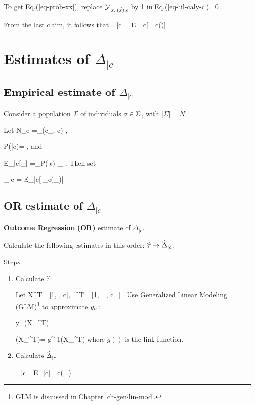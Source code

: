 To get  Eq.(\ref{eq-prob-xx}), 
replace ${\cal Y}_{|x_c({{\widetilde{x}}}), c}$ by 1
in Eq.(\ref{eq-til-caly-c}).
\qed

From the last claim, it follows that
\beq
\Delta_{|c} = 
{E_{\ul{\tilx}|c}[
\lam_c(\tilx)]}
\eeq


\section{Estimates of $\Delta_{|c}$}

\subsection{Empirical estimate of $\Delta_{|c}$ }
Consider a population $\Sigma$
of individuals $\sigma\in \Sigma$,
with $|\Sigma|=N$.

Let
\beq
N_c =\sum_\s \delta(c_\s, c)
\;,
\eeq

\beq
P(\s|c)= 
\;,
\eeq
and

\beq
E_{\s|c}[\xi_\s] =\sum_\s P(\s|c) \xi_\s
\;.
\eeq
Then set

\beq
\HAT{\Delta}_{|c} = 
{E_{\s|c}[
\lam_c(\tilx_\s)]}
\eeq

\subsection{OR estimate of $\Delta_{|c}$}

{\bf Outcome Regression (OR)} estimate
of $\Delta_{|c}$.

Calculate the
following estimates in this order:
${\widehat{\tau}}
\rightarrow{\widehat{\Delta}}_{|c}$.

Steps:
\begin{enumerate}
\item Calculate ${\widehat{\tau}}$

Let
\beq
{X}^T= [1, \tilx, c],_\s^T= [1, \tilx_\s, c_\s]
\;.
\eeq
Use Generalized 
Linear Modeling (GLM)\footnote{GLM
is discussed in Chapter \ref{ch-gen-lin-mod}.}
to approximate $y_\sigma$:

\beq
y_\s \approx {}(X_\s^T\HAT{\tau})
\eeq

\beq
{}(X_\s^T\HAT{\tau})= g^{-1}(X_\s^T\HAT{\tau})
\eeq
where $g()$ is the link function.

\item Calculate ${\widehat{\Delta}}_{|c}$

\beq
\HAT{\Delta}_{|c}=
{E_{\s|c}[
\lam_c(\tilx_\s)]}
\label{eq-or-est}
\eeq

\end{enumerate}


